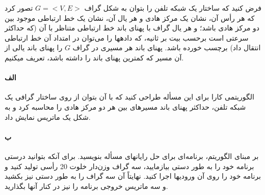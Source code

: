 \documentclass[]{article}
\begin{document}
فرض کنید که ساختار یک شبکه تلفن را بتوان به شکل گراف $G = <V, E>$ تصور کرد 
که هر رأس آن، نشان یک مرکز هادی و هر یال آن، نشان یک خط ارتباطی موجود بین دو مرکز هادی باشد؛ و هر یال گراف با پهنای باند خط ارتباطی متناظر با آن
(که حداکثر سرعتی است برحسب بیت بر ثانیه، که دادهها را می‌توان در امتداد آن خط ارتباطی انتقال داد) برچسب خورده باشد.
پهنای باند هر مسیری در گراف $G$ را پهنای باند یالی از آن مسیر که کمترین پهنای باند را داشته باشد، تعریف میکنیم.

\paragraph*{الف}
الگوریتمی کارا برای این مسأله طراحی کنید که با آن بتوان از روی ساختار گرافی یک شبکه تلفن، حداکثر پهنای باند مسیرهای بین هر دو مرکز هادی را محاسبه کرد و به شکل یک ماتریس نمایش داد. 

\paragraph*{ب}
بر مبنای الگوریتم، برنامه‌ای برای حل رایانهای مسأله بنویسید. برای آنکه بتوانید درستی برنامه خود را به طور دستی بیازمایید،
سه گراف وزن‌دار خلوت 20 رأسی تولید کنید و برنامه خود را روی آن ورودیها اجرا کنید. نهایتاً آن سه گراف را به طور دستی نیز بکشید و سه ماتریس خروجی‌ برنامه را نیز در کنار آنها بگذارید. 
\end{document}
